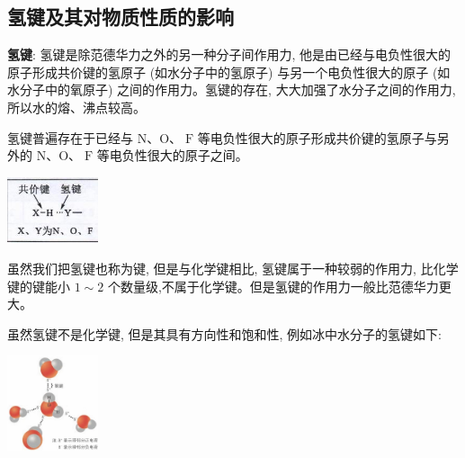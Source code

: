 \documentclass[10pt,cn]{elegantbook}
\begin{document}
\subsection{ 氢键及其对物质性质的影响}

\textbf{氢键}: 氢键是除范德华力之外的另一种分子间作用力, 他是由已经与电负性很大的原子形成共价键的氢原子 (如水分子中的氢原子) 与另一个电负性很大的原子 (如水分子中的氧原子) 之间的作用力。氢键的存在, 大大加强了水分子之间的作用力, 所以水的熔、沸点较高。

氢键普遍存在于已经与 \(\mathrm{N}\text{、}\mathrm{O}\text{、}\mathrm{\;F}\) 等电负性很大的原子形成共价键的氢原子与另外的 \(\mathrm{N}\text{、}\mathrm{O}\text{、}\mathrm{\;F}\) 等电负性很大的原子之间。

\begin{center}
	\includegraphics[max width=0.2\textwidth]{image/c96-1.jpg}
\end{center}

虽然我们把氢键也称为键, 但是与化学键相比, 氢键属于一种较弱的作用力, 比化学键的键能小 \(1 \sim 2\) 个数量级,不属于化学键。但是氢键的作用力一般比范德华力更大。

虽然氢键不是化学键, 但是其具有方向性和饱和性, 例如冰中水分子的氢键如下:

\begin{center}
	\includegraphics[max width=0.2\textwidth]{image/c96-2.jpg}
\end{center}


\begin{center}
\end{center}
\end{document}
